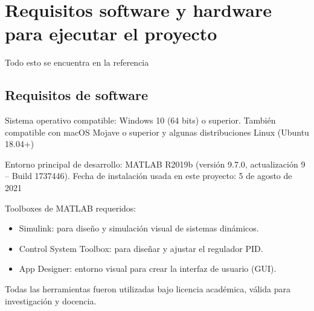 
\section{Requisitos software y hardware para ejecutar el proyecto}
Todo esto se encuentra en la referencia \cite{mathworks_system_requirements_matlab}
\subsection{Requisitos de software}
Sistema operativo compatible: Windows 10 (64 bits) o superior. También compatible con macOS Mojave o superior y algunas distribuciones Linux (Ubuntu 18.04+)

Entorno principal de desarrollo:
MATLAB R2019b (versión 9.7.0, actualización 9 – Build 1737446). Fecha de instalación usada en este proyecto: 5 de agosto de 2021

Toolboxes de MATLAB requeridos:
\begin{itemize}
    \item Simulink: para diseño y simulación visual de sistemas dinámicos.
    \item Control System Toolbox: para diseñar y ajustar el regulador PID.
    \item App Designer: entorno visual para crear la interfaz de usuario (GUI).
\end{itemize}

Todas las herramientas fueron utilizadas bajo licencia académica, válida para investigación y docencia.


